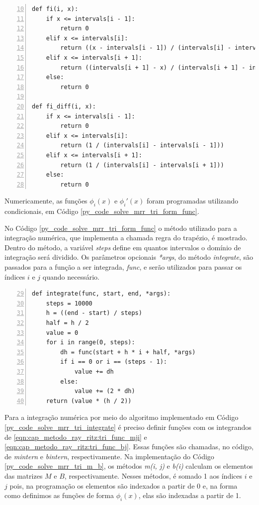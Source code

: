 \documentclass[
	12pt,				%
	openright,			%
    twoside,			%
	a4paper,			%
	english,			%
	french,				%
	spanish,			%
	brazil				%
	]{abntex2}
\numberwithin{lema}{chapter}
\numberwithin{teorema}{chapter}
\numberwithin{definicao}{chapter}
\numberwithin{exemplo}{chapter}
\numberwithin{figure}{chapter}
\begin{document}
\begin{lstlisting}[style=Python, xleftmargin=2em, numbers=left, firstnumber=10, caption={Função de forma $\phi$ e sua derivada}, captionpos=t, label=py_code_solve_mrr_tri_form_func]
def fi(i, x):
    if x <= intervals[i - 1]:
        return 0
    elif x <= intervals[i]:
        return ((x - intervals[i - 1]) / (intervals[i] - intervals[i - 1]))
    elif x <= intervals[i + 1]:
        return ((intervals[i + 1] - x) / (intervals[i + 1] - intervals[i]))
    else:
        return 0

def fi_diff(i, x):
    if x <= intervals[i - 1]:
        return 0
    elif x <= intervals[i]:
        return (1 / (intervals[i] - intervals[i - 1]))
    elif x <= intervals[i + 1]:
        return (1 / (intervals[i] - intervals[i + 1]))
    else:
        return 0
\end{lstlisting}

Numericamente, as funções $\phi_i(x)$ e $\phi_i'(x)$ foram programadas utilizando condicionais, em Código \ref{py_code_solve_mrr_tri_form_func}.

No Código \ref{py_code_solve_mrr_tri_form_func} o método utilizado para a integração numérica, que implementa a chamada regra do trapézio, é mostrado. Dentro do método, a variável \textit{steps} define em quantos intervalos o domínio de integração será dividido. Os parâmetros opcionais \textit{*args}, do método \textit{integrate}, são passados para a função a ser integrada, \textit{func}, e serão utilizados para passar os índices $i$ e $j$ quando necessário.

\begin{lstlisting}[style=Python, xleftmargin=2em, numbers=left, firstnumber=29, caption={Algoritmo para integração numérica usando a regra dos trapézios}, captionpos=t, label=py_code_solve_mrr_tri_integrate]
def integrate(func, start, end, *args):
    steps = 10000
    h = ((end - start) / steps)
    half = h / 2
    value = 0
    for i in range(0, steps):
        dh = func(start + h * i + half, *args)
        if i == 0 or i == (steps - 1):
            value += dh
        else:
            value += (2 * dh)
    return (value * (h / 2))
\end{lstlisting}

Para a integração numérica por meio do algoritmo implementado em Código \ref{py_code_solve_mrr_tri_integrate} é preciso definir funções com os integrandos de \eqref{eqn:cap_metodo_ray_ritz:tri_func_mji} e \eqref{eqn:cap_metodo_ray_ritz:tri_func_bj}. Essas funções são chamadas, no código, de \textit{m\underline{\hspace{.1in}}intern} e \textit{b\underline{\hspace{0.1in}}intern}, respectivamente. Na implementação do Código \ref{py_code_solve_mrr_tri_m_b}, os métodos \textit{m(i, j)} e \textit{b(i)} calculam os elementos das matrizes $M$ e $B$, respectivamente. Nesses métodos, é somado 1 aos índices $i$ e $j$ pois, na programação os elementos são indexados a partir de 0 e, na forma como definimos as funções de forma $\phi_i(x)$, elas são indexadas a partir de 1.
\end{document}
